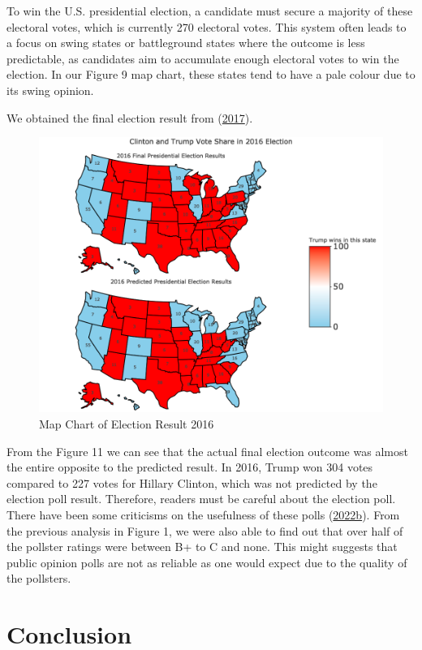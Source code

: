 \documentclass[
  12pt,
]{article}
\begin{document}
To win the U.S. presidential election, a candidate must secure a
majority of these electoral votes, which is currently 270 electoral
votes. This system often leads to a focus on swing states or
battleground states where the outcome is less predictable, as candidates
aim to accumulate enough electoral votes to win the election. In our
Figure 9 map chart, these states tend to have a pale colour due to its
swing opinion.

We obtained the final election result from
(\protect\hyperlink{ref-Final}{2017}).

\begin{figure}
\centering
\includegraphics{./Figures/mapchart_3_4.png}
\caption{Map Chart of Election Result 2016}
\end{figure}

From the Figure 11 we can see that the actual final election outcome was
almost the entire opposite to the predicted result. In 2016, Trump won
304 votes compared to 227 votes for Hillary Clinton, which was not
predicted by the election poll result. Therefore, readers must be
careful about the election poll. There have been some criticisms on the
usefulness of these polls (\protect\hyperlink{ref-Critic2}{2022b}). From
the previous analysis in Figure 1, we were also able to find out that
over half of the pollster ratings were between B+ to C and none. This
might suggests that public opinion polls are not as reliable as one
would expect due to the quality of the pollsters.

\hypertarget{conclusion}{%
\section{Conclusion}\label{conclusion}}
\end{document}
